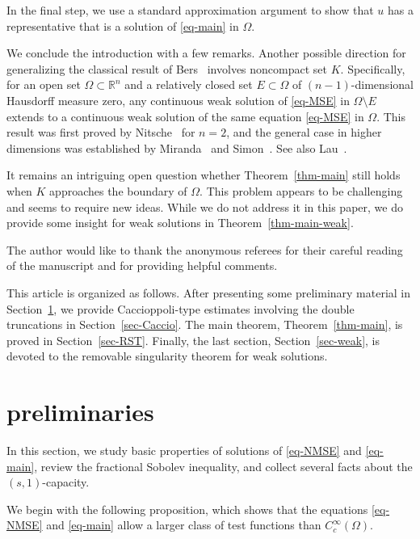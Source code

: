 \documentclass{amsart}
\theoremstyle{plain}
\theoremstyle{definition}
\numberwithin{equation}{section}
\begin{document}
In the final step, we use a standard approximation argument to show that $u$ has a representative that is a solution of \eqref{eq-main} in $\Omega$.

We conclude the introduction with a few remarks. Another possible direction for generalizing the classical result of Bers~\cite{Ber51} involves noncompact set $K$. Specifically, for an open set $\Omega \subset \mathbb{R}^n$ and a relatively closed set $E \subset \Omega$ of $(n-1)$-dimensional Hausdorff measure zero, any continuous weak solution of \eqref{eq-MSE} in $\Omega \setminus E$ extends to a continuous weak solution of the same equation \eqref{eq-MSE} in $\Omega$. This result was first proved by Nitsche~\cite{Nit65} for $n=2$, and the general case in higher dimensions was established by Miranda~\cite{Mir77} and Simon~\cite{Sim77}. See also Lau~\cite{Lau88}.

It remains an intriguing open question whether Theorem~\ref{thm-main} still holds when $K$ approaches the boundary of $\Omega$. This problem appears to be challenging and seems to require new ideas. While we do not address it in this paper, we do provide some insight for weak solutions in Theorem~\ref{thm-main-weak}.

The author would like to thank the anonymous referees for their careful reading of the manuscript and for providing helpful comments.

This article is organized as follows. After presenting some preliminary material in Section~\ref{sec-preliminaries}, we provide Caccioppoli-type estimates involving the double truncations in Section~\ref{sec-Caccio}. The main theorem, Theorem~\ref{thm-main}, is proved in Section~\ref{sec-RST}. Finally, the last section, Section~\ref{sec-weak}, is devoted to the removable singularity theorem for weak solutions.

\section{preliminaries}\label{sec-preliminaries}

In this section, we study basic properties of solutions of \eqref{eq-NMSE} and \eqref{eq-main}, review the fractional Sobolev inequality, and collect several facts about the $(s, 1)$-capacity.

We begin with the following proposition, which shows that the equations \eqref{eq-NMSE} and \eqref{eq-main} allow a larger class of test functions than $C^\infty_c(\Omega)$.
\end{document}
